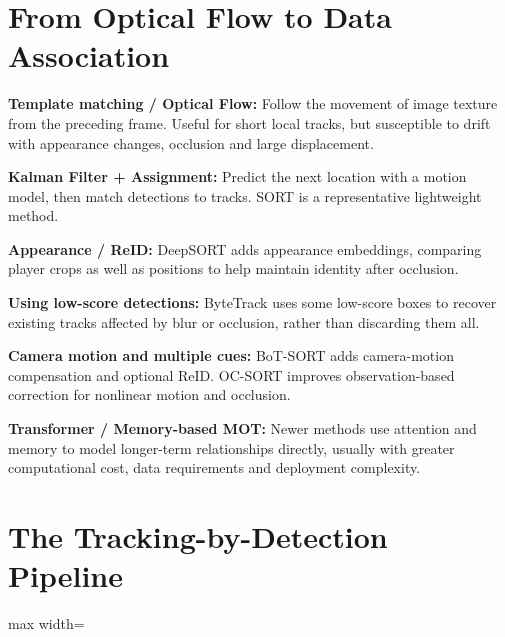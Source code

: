 \documentclass[11pt,a4paper,oneside]{report}
\begin{document}
\section{From Optical Flow to Data Association}

\begin{historyBox}
\textbf{Template matching / Optical Flow:}\quad
Follow the movement of image texture from the preceding frame. Useful for short local tracks, but susceptible to drift with appearance changes, occlusion and large displacement.

\textbf{Kalman Filter + Assignment:}\quad
Predict the next location with a motion model, then match detections to tracks. SORT is a representative lightweight method.

\textbf{Appearance / ReID:}\quad
DeepSORT adds appearance embeddings, comparing player crops as well as positions to help maintain identity after occlusion.

\textbf{Using low-score detections:}\quad
ByteTrack uses some low-score boxes to recover existing tracks affected by blur or occlusion, rather than discarding them all.

\textbf{Camera motion and multiple cues:}\quad
BoT-SORT adds camera-motion compensation and optional ReID. OC-SORT improves observation-based correction for nonlinear motion and occlusion.

\textbf{Transformer / Memory-based MOT:}\quad
Newer methods use attention and memory to model longer-term relationships directly, usually with greater computational cost, data requirements and deployment complexity.
\end{historyBox}

\section{The Tracking-by-Detection Pipeline}

\begin{center}
\begin{adjustbox}{max width=\linewidth}
\end{adjustbox}
\end{center}
\end{document}

